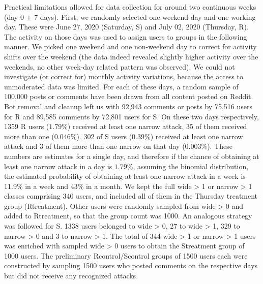 \documentclass[10pt,dvipsnames]{scrartcl}
\begin{document}
Practical limitations allowed for data collection for around two
continuous weeks (day 0 \(\pm\) 7 days). First, we randomly selected one
weekend day and one working day. These were June 27, 2020 (Saturday,
\textsf{S}) and July 02, 2020 (Thursday, \textsf{R}). The activity on
those days was used to assign users to groups in the following manner.
We picked one weekend and one non-weekend day to correct for activity
shifts over the weekend (the data indeed revealed slightly higher
activity over the weekends, no other week-day related pattern was
observed). We could not investigate (or correct for) monthly activity
variations, because the access to unmoderated data was limited. For each
of these days, a random sample of 100,000 posts or comments have been
drawn from all content posted on \textsf{Reddit}. Bot removal and
cleanup left us with 92,943 comments or posts by 75,516 users for
\textsf{R} and 89,585 comments by 72,801 users for \textsf{S}. On these
two days respectively, 1359 \textsf{R} users (\(1.79\%\)) received at
least one \textsf{narrow} attack, 35 of them received more than one
(\(0.046\%\)). 302 of \textsf{S} users (\(0.39\%\)) received at least
one \textsf{narrow} attack and 3 of them more than one \textsf{narrow}
on that day (\(0.003\%\)). These numbers are estimates for a single day,
and therefore if the chance of obtaining at least one \textsf{narrow}
attack in a day is \(1.79\%\), assuming the binomial distribution, the
estimated probability of obtaining at least one \textsf{narrow} attack
in a week is 11.9\% in a week and 43\% in a month. We kept the full
\textsf{wide > 1} or \textsf{narrow > 1} classes comprising 340 users,
and included all of them in the Thursday treatment group
(\textsf{Rtreatment}). Other users were randomly sampled from
\textsf{wide > 0} and added to \textsf{Rtreatment}, so that the group
count was 1000. An analogous strategy was followed for \textsf{S}. 1338
users belonged to \textsf{wide > 0}, 27 to \textsf{wide > 1}, 329 to
\textsf{narrow > 0} and 3 to \textsf{narrow > 1}. The total of 344
\textsf{wide > 1} or \textsf{narrow > 1} users was enriched with sampled
\textsf{wide > 0} users to obtain the \textsf{Streatment} group of 1000
users. The preliminary \textsf{Rcontrol}/\textsf{Scontrol} groups of
1500 users each were constructed by sampling 1500 users who posted
comments on the respective days but did not receive any recognized
attacks.

\noindent
\end{document}
